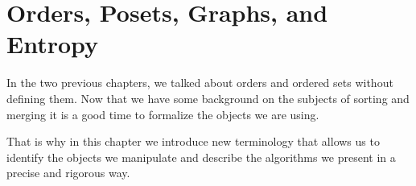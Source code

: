 \chapter{Orders, Posets, Graphs, and Entropy}

In the two previous chapters, we talked about orders and ordered sets without
defining them. Now that we have some background on the subjects of
sorting and merging it is a good time to formalize the objects we are using.

That is why in this chapter we introduce new terminology that allows
us to identify the objects we manipulate and describe the algorithms we present
in a precise and rigorous way.


